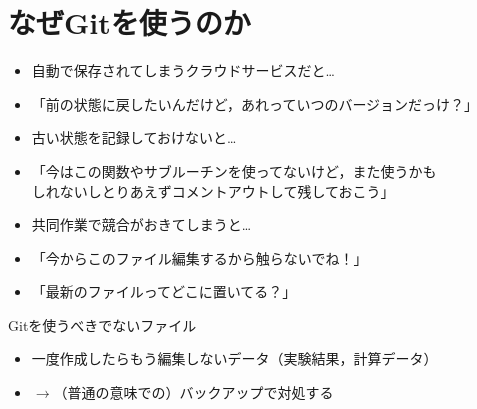 \documentclass[12pt,dvipdfmx,svgnames,uplatex,aspectratio=169]{beamer}
\begin{document}
\section{なぜGitを使うのか}
\begin{frame}{\insertsection}
  \begin{itemize}
    \item 自動で保存されてしまうクラウドサービスだと…
    \item[] 「前の状態に戻したいんだけど，あれっていつのバージョンだっけ？」
    \item 古い状態を記録しておけないと…
    \item[] 「今はこの関数やサブルーチンを使ってないけど，また使うかも\\しれないしとりあえずコメントアウトして残しておこう」
    \item 共同作業で競合がおきてしまうと…
    \item[] 「今からこのファイル編集するから触らないでね！」
    \item[] 「最新のファイルってどこに置いてる？」
  \end{itemize}

  \begin{block}{Gitを使うべきでないファイル}
    \begin{itemize}
      \item 一度作成したらもう編集しないデータ（実験結果，計算データ）
      \item[] \(\to\)（普通の意味での）バックアップで対処する
    \end{itemize}
  \end{block}
\end{frame}
\end{document}

